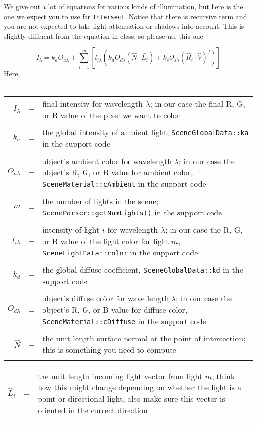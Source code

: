 \documentclass[10pt,twocolumn]{article}
\begin{document}
We give out a lot of equations for various kinds of illumination, but here is the one we expect you to use for {\tt Intersect}. Notice that there is recursive term and you are not expected to take light attenuation or shadows into account. This is slightly different from the equation in class, so please use this one{
\[I_{\lambda} = k_aO_{a\lambda} + \sum_{i=1}^{m} \left[l_{i\lambda}(k_dO_{d\lambda}(\hat{N} \cdot \hat{L}_i)  + k_sO_{s\lambda}(\hat{R}_i\cdot\hat{V})^f)\right]\]
Here,\\\\
\begin{tabular}{rcp{2.3in}}
$I_{\lambda}$ & = & final intensity for wavelength $\lambda$; in our case the final R, G, or B value of the pixel we want to color\\\\
$k_a$ & = & the global intensity of ambient light; {\small{\tt SceneGlobalData::ka}} in the support code\\\\
$O_{a\lambda}$ &=& object's ambient color for wavelength $\lambda$; in our case the object's R, G, or B value for ambient color, {\small{\tt SceneMaterial::cAmbient}} in the support code\\\\
$m$ &=& the number of lights in the scene; {\small{\tt SceneParser::getNumLights()}} in the support code\\\\
$l_{i\lambda}$ &=& intensity of light $i$ for wavelength $\lambda$; in our case the R, G, or B value of the light color for light $m$, {\small{\tt SceneLightData::color}} in the support code\\\\
$k_d$ &=& the global diffuse coefficient, {\small{\tt SceneGlobalData::kd}} in the support code\\\\
$O_{d\lambda}$ &=& object's diffuse color for wave length $\lambda$; in our case the object's R, G, or B value for diffuse color, {\small{\tt SceneMaterial::cDiffuse}} in the support code\\\\
$\hat{N}$ &=& the unit length surface normal at the point of intersection; this is something you need to compute\\\\
\end{tabular}
\begin{tabular}{rcp{2.3in}}
$\hat{L}_i$ &=& the unit length incoming light vector from light $m$; think how this might change depending on whether the light is a point or directional light, also make sure this vector is oriented in the correct direction\\\\

\end{tabular}}
\end{document}

